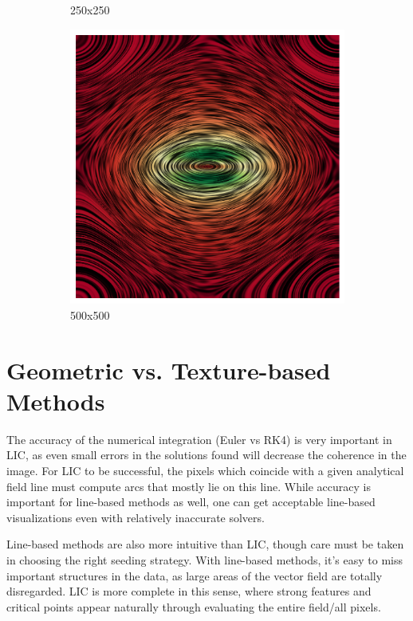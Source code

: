\documentclass{article}
\begin{document}
\begin{figure}[h!]
\begin{subfigure}{0.32\textwidth}
        \caption{250x250}
    \end{subfigure}
    \hfill
    \begin{subfigure}{0.32\textwidth}
        \centering
        \includegraphics[width=\textwidth]{metsim_500_500.png}
        \caption{500x500}
    \end{subfigure}
    \caption{}
\end{figure}

\section{Geometric vs. Texture-based Methods}
The accuracy of the numerical integration (Euler vs RK4) is very important in LIC, as even small errors in the solutions found will decrease the coherence in the image.
For LIC to be successful, the pixels which coincide with a given analytical field line must compute arcs that mostly lie on this line. While accuracy is important
for line-based methods as well, one can get acceptable line-based visualizations even with relatively inaccurate solvers.

Line-based methods are also more intuitive than LIC, though care must be taken in choosing the right seeding strategy. With line-based methods, it's easy to miss
important structures in the data, as large areas of the vector field are totally disregarded. LIC is more complete in this sense, where strong features and critical points
appear naturally through evaluating the entire field/all pixels.
\end{document}
